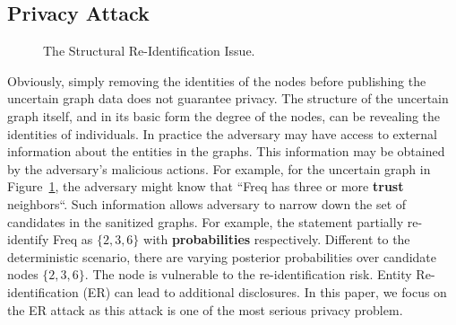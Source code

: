 \subsection{Privacy Attack}
\label{sec:AMPC}
\vspace{-5pt}
\begin{figure}[!htb]
  \vspace{-10pt}
    \vspace{-7pt}
    \caption{The Structural Re-Identification Issue.}
    \label{fig:privacyAttack}
    \vspace{-7pt}
\end{figure} 
Obviously, simply removing the identities of the nodes before publishing the uncertain graph data does not guarantee privacy.  The structure of the uncertain graph itself, and in its basic form the degree of the nodes, can be revealing the identities of individuals. 
In practice the adversary may have access to external information about the entities in the graphs. This information may be obtained by the adversary's malicious actions. For example, for the uncertain graph in Figure~\ref{fig:privacyAttack}, the adversary might know that ``Freq has three or more \textbf{trust} neighbors“. Such information allows adversary to narrow down the set of candidates in the sanitized graphs. For example, the statement partially re-identify Freq as $\lbrace 2,3,6 \rbrace$ with \textbf{probabilities} respectively. Different to the deterministic scenario,  there are varying posterior probabilities over candidate nodes $\lbrace 2,3,6 \rbrace$. The node is vulnerable to the re-identification risk. Entity Re-identification (ER) can lead to additional disclosures. In this paper, we focus on the ER attack as this attack is one of the most serious privacy problem. 


